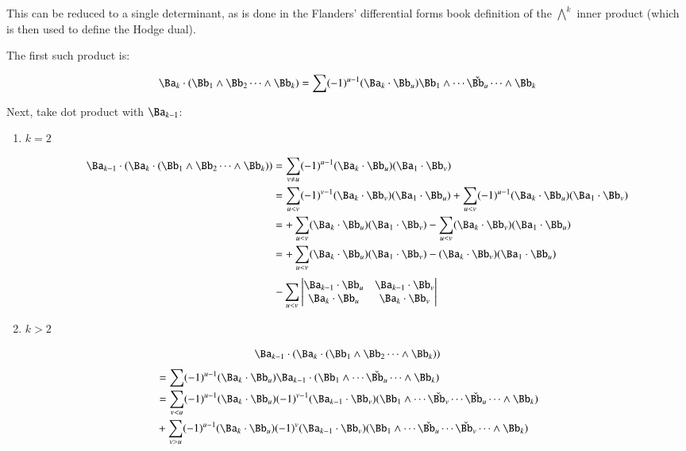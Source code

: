 This can be reduced to a single determinant, as is done in
the Flanders' differential forms book definition of the 
${\bigwedge}^k$ inner product (which is then used to define the Hodge dual).

The first such product is:

\[
\Ba_k \cdot (\Bb_1 \wedge \Bb_2 \cdots \wedge \Bb_k)
= \sum (-1)^{u-1} (\Ba_k \cdot \Bb_u) \Bb_1 \wedge \cdots \check{\Bb_u} \cdots \wedge \Bb_k
\]

Next, take dot product with $\Ba_{k-1}$:

\begin{enumerate}
\item $k=2$

\begin{align*}
\Ba_{k-1} \cdot (\Ba_k \cdot (\Bb_1 \wedge \Bb_2 \cdots \wedge \Bb_k))
&= \sum_{v \ne u} (-1)^{u-1} (\Ba_k \cdot \Bb_u) (\Ba_1 \cdot \Bb_v) \\
&= 
 \sum_{u < v} (-1)^{v-1} (\Ba_k \cdot \Bb_v) (\Ba_1 \cdot \Bb_u) 
+\sum_{u < v} (-1)^{u-1} (\Ba_k \cdot \Bb_u) (\Ba_1 \cdot \Bb_v) \\
&= 
+\sum_{u < v} (\Ba_k \cdot \Bb_u) (\Ba_1 \cdot \Bb_v) 
-\sum_{u < v} (\Ba_k \cdot \Bb_v) (\Ba_1 \cdot \Bb_u) \\
&= 
+\sum_{u< v} (\Ba_k \cdot \Bb_u) (\Ba_1 \cdot \Bb_v) 
- (\Ba_k \cdot \Bb_v) (\Ba_1 \cdot \Bb_u) \\
\end{align*}
\begin{equation}\label{eqn:bladegradereduction:k2dot}
-\sum_{u< v}
\begin{vmatrix}
\Ba_{k-1} \cdot \Bb_u & \Ba_{k-1} \cdot \Bb_v \\
\Ba_k \cdot \Bb_u & \Ba_k \cdot \Bb_v \\
\end{vmatrix}
\end{equation}

\item $k>2$
\end{enumerate}

\[
\Ba_{k-1} \cdot (\Ba_k \cdot (\Bb_1 \wedge \Bb_2 \cdots \wedge \Bb_k))
\]
\begin{align*}
&= \sum (-1)^{u-1} (\Ba_k \cdot \Bb_u) \Ba_{k-1} \cdot (\Bb_1 \wedge \cdots \check{\Bb_u} \cdots \wedge \Bb_k) \\
&= \sum_{v<u} (-1)^{u-1} (\Ba_k \cdot \Bb_u) (-1)^{v-1} (\Ba_{k-1} \cdot \Bb_v) (\Bb_1 \wedge \cdots \check{\Bb_v} \cdots \check{\Bb_u} \cdots \wedge \Bb_k) \\
&+ \sum_{v>u} (-1)^{u-1} (\Ba_k \cdot \Bb_u) (-1)^{v} (\Ba_{k-1} \cdot \Bb_v) (\Bb_1 \wedge \cdots \check{\Bb_u} \cdots \check{\Bb_v} \cdots \wedge \Bb_k) \\
\end{align*}

